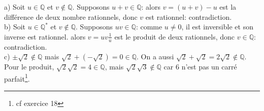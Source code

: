 a) Soit $u\in\mathbb{Q}$ et $v\notin \mathbb{Q}$. Supposons $u+v\in\mathbb{Q}$: alors $v=(u+v)-u$ est la différence de deux nombre rationnels, donc $v$ est rationnel: contradiction.\\
b) Soit $u\in\mathbb{Q}^*$ et $v\notin \mathbb{Q}$. Supposons $uv\in\mathbb{Q}$: comme $u\neq 0$, il est inversible et son inverse est rationnel. alors $v=uv\frac{1}{u}$ est le produit de deux rationnels, donc $v\in\mathbb{Q}$: contradiction.\\
c) $\pm \sqrt{2}\notin\mathbb{Q}$ mais $\sqrt{2}+(-\sqrt{2})=0\in \mathbb{Q}$. On a aussi $\sqrt{2}+\sqrt{2}=2\sqrt{2}\notin\mathbb{Q}$. Pour le produit, $\sqrt{2}\sqrt{2}=4\in \mathbb{Q}$, mais $\sqrt{2}\sqrt{3}\notin \mathbb{Q}$ car 6 n'est pas un carré parfait\footnote{cf exercice 18}.
